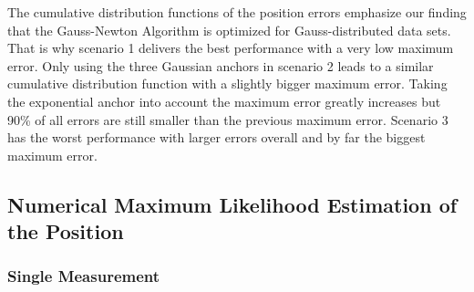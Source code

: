 \documentclass{article}
\begin{document}
\begin{itemize}
        The cumulative distribution functions of the position errors emphasize our finding that the Gauss-Newton Algorithm is optimized for Gauss-distributed data sets. That is why scenario 1 delivers the best performance with a very low maximum error. Only using the three Gaussian anchors in scenario 2 leads to a similar cumulative distribution function with a slightly bigger maximum error. Taking the exponential anchor into account the maximum error greatly increases but 90\% of all errors are still smaller than the previous maximum error. Scenario 3 has the worst performance with  larger errors overall and by far the biggest maximum error.

\end{itemize}


\subsection{Numerical Maximum Likelihood Estimation of the Position}
\subsubsection{Single Measurement}
\end{document}
